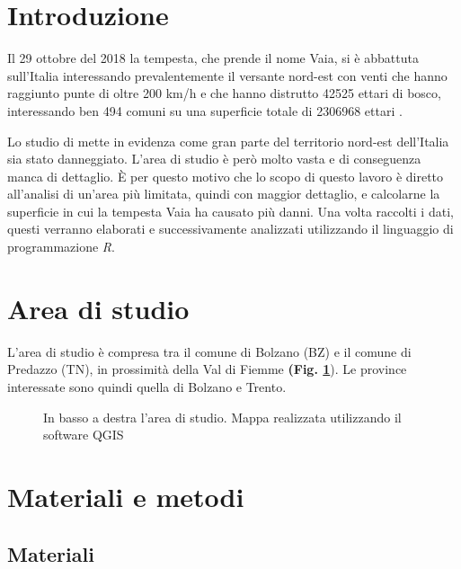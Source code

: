 \documentclass[a4paper,12pt]{article}
\begin{document}
\section{Introduzione}
    Il 29 ottobre del 2018 la tempesta, che prende il nome Vaia, si è abbattuta sull'Italia interessando prevalentemente il versante nord-est con venti che hanno raggiunto punte di oltre 200 km/h e che hanno distrutto 42525 ettari di bosco, interessando ben 494 comuni su una superficie totale di 2306968 ettari \textbf{\citep{Chirici_2019}}.
    
    Lo studio di \textbf{\citet{Chirici_2019}} mette in evidenza come gran parte del territorio nord-est dell'Italia sia stato danneggiato. L'area di studio è però molto vasta e di conseguenza manca di dettaglio. \`E per questo motivo che lo scopo di questo lavoro è diretto all'analisi di un'area più limitata, quindi con maggior dettaglio,  e calcolarne la superficie in cui la tempesta Vaia ha causato più danni. Una volta raccolti i dati, questi verranno elaborati e successivamente analizzati utilizzando il linguaggio di programmazione \textit{R}.
    

\section{Area di studio}

L'area di studio è compresa tra il comune di Bolzano (BZ) e il comune di Predazzo (TN), in prossimità della Val di Fiemme \textbf{(Fig. \ref{fig:areastudio}}). Le province interessate sono quindi quella di Bolzano e Trento.

\begin{figure}
\centering
    \setlength{\fboxsep}{0pt}%
    \setlength{\fboxrule}{1pt}%
    \caption{In basso a destra l'area di studio. Mappa realizzata utilizzando il software QGIS}
    \label{fig:areastudio}
\end{figure}



\section{Materiali e metodi}

\subsection{Materiali}
\end{document}
